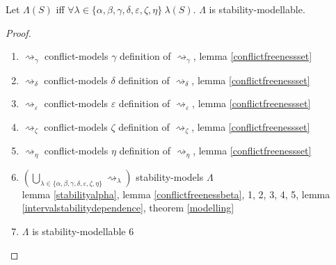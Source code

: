\begin{theorem}
	Let $\Lambda(S)$ iff $\forall\lambda\in\{\alpha,\beta,\gamma,\delta,\varepsilon,\zeta,\eta\}\ \lambda(S)$. $\Lambda$ is stability-modellable.
	
	\begin{proof}\ 
		\begin{enumerate}
			\item $\rightsquigarrow_\gamma$ conflict-models $\gamma$ \hfill definition of $\rightsquigarrow_\gamma$, lemma \ref{conflictfreenessset}
			\item $\rightsquigarrow_\delta$ conflict-models $\delta$ \hfill definition of $\rightsquigarrow_\delta$, lemma \ref{conflictfreenessset}
			\item $\rightsquigarrow_\varepsilon$ conflict-models $\varepsilon$ \hfill definition of $\rightsquigarrow_\varepsilon$, lemma \ref{conflictfreenessset}
			\item $\rightsquigarrow_\zeta$ conflict-models $\zeta$ \hfill definition of $\rightsquigarrow_\zeta$, lemma \ref{conflictfreenessset}
			\item $\rightsquigarrow_\eta$ conflict-models $\eta$ \hfill definition of $\rightsquigarrow_\eta$, lemma \ref{conflictfreenessset}
			\item $\left(\bigcup_{\lambda\in\{\alpha,\beta,\gamma,\delta,\varepsilon,\zeta,\eta\}}\rightsquigarrow_\lambda\right)$ stability-models $\Lambda$\\\indent\hfill lemma \ref{stabilityalpha}, lemma \ref{conflictfreenessbeta}, 1, 2, 3, 4, 5, lemma \ref{intervalstabilitydependence}, theorem \ref{modelling}
			\item $\Lambda$ is stability-modellable \hfill 6
		\end{enumerate}
	\end{proof}
\end{theorem}
